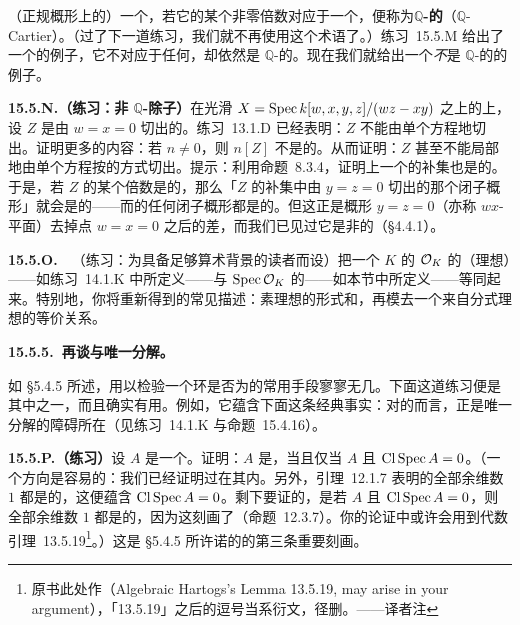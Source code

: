 （正规概形上的）一个\trWeilDivisor，若它的某个非零倍数对应于一个\trLineBundle，便称为\textbf{$\mathbb{Q}$-\trCartier{}的}（$\mathbb{Q}$-Cartier）。（过了下一道练习，我们就不再使用这个术语了。）\mbox{练习~15.5.M} 给出了一个\trWeilDivisor{}的例子，它不对应于任何\trLineBundle，却依然是 $\mathbb{Q}$-\trCartier{}的。现在我们就给出一个\emph{不}是 $\mathbb{Q}$-\trCartier{}的\trWeilDivisor{}的例子。

\textbf{15.5.N.（练习：非 $\mathbb{Q}$-\trCartier{}除子）}\quad 在光滑\trQuadricSurface{} $X=\operatorname{Spec} k[w,x,y,z]/(wz-xy)$ 之上的\trCone{}上，设 $Z$ 是由 $w=x=0$ 切出的\trWeilDivisor{}。\mbox{练习~13.1.D} 已经表明：$Z$ 不能由单个方程\trSchemeTheoretic{}地切出。证明更多的内容：若 $n\ne 0$，则 $n[Z]$ 不是\trLocallyPrincipal{}的。从而证明：$Z$ 甚至不能局部地由单个方程按\emph{\trSetTheoretic}的方式切出。提示：利用\mbox{命题~8.3.4}，证明\trAffineScheme{}上一个\trEffectiveCartierDivisor{}的补集也是\trAffine{}的。于是，若 $Z$ 的某个倍数是\trLocallyPrincipal{}的，那么「$Z$ 的补集中由 $y=z=0$ 切出的那个闭子概形」就会是\trAffine{}的——而\trAffineScheme{}的任何闭子概形都是\trAffine{}的。但这正是概形 $y=z=0$（亦称 $wx$-平面）去掉点 $w=x=0$ 之后的差，而我们已见过它是非\trAffine{}的（\S4.4.1）。

\textbf{15.5.O.}\ \hard\ （练习：为具备足够算术背景的读者而设）\quad 把一个\trNumberField{} $K$ 的\trRingOfIntegers{} $\mathcal{O}_K$ 的（理想）\trClassGroup——如\mbox{练习~14.1.K} 中所定义——与 $\operatorname{Spec}\mathcal{O}_K$ 的\trClassGroup——如本节中所定义——等同起来。特别地，你将重新得到\trClassGroup{}的常见描述：素理想的形式和，再模去一个来自\trPrincipal{}分式理想的等价关系。

\textbf{15.5.5.\ 再谈\trClassGroup{}与唯一分解。}

如 \S5.4.5 所述，用以检验一个环是否为\trUFD{}的常用手段寥寥无几。下面这道练习便是其中之一，而且确实有用。例如，它蕴含下面这条经典事实：对\trNumberField{}的\trRingOfIntegers{}而言，\trClassGroup{}正是唯一分解的障碍所在（见\mbox{练习~14.1.K} 与\mbox{命题~15.4.16}）。

\textbf{15.5.P.（练习）}\quad 设 $A$ 是一个\trNoetherian\trIntegralDomain。证明：$A$ 是\trUFD，当且仅当 $A$ \trIntegrallyClosed{}且 $\operatorname{Cl}\operatorname{Spec} A=0$。（一个方向是容易的：我们已经证明过\trUFD{}在其\trFractionField{}内\trIntegrallyClosed。另外，\mbox{引理~12.1.7} 表明\trUFD{}的全部余维数 $1$ \trPrimeIdeal{}都是\trPrincipal{}的，这便蕴含 $\operatorname{Cl}\operatorname{Spec} A=0$。剩下要证的，是若 $A$ \trIntegrallyClosed{}且 $\operatorname{Cl}\operatorname{Spec} A=0$，则全部余维数 $1$ \trPrimeIdeal{}都是\trPrincipal{}的，因为这刻画了\trUFD（\mbox{命题~12.3.7}）。你的论证中或许会用到\mbox{代数\trHartogs{}引理~13.5.19}\footnote{原书此处作（Algebraic Hartogs's Lemma 13.5.19, may arise in your argument），「13.5.19」之后的逗号当系衍文，径删。——译者注}。）这是 \S5.4.5 所许诺的\trUFD{}的第三条重要刻画。

